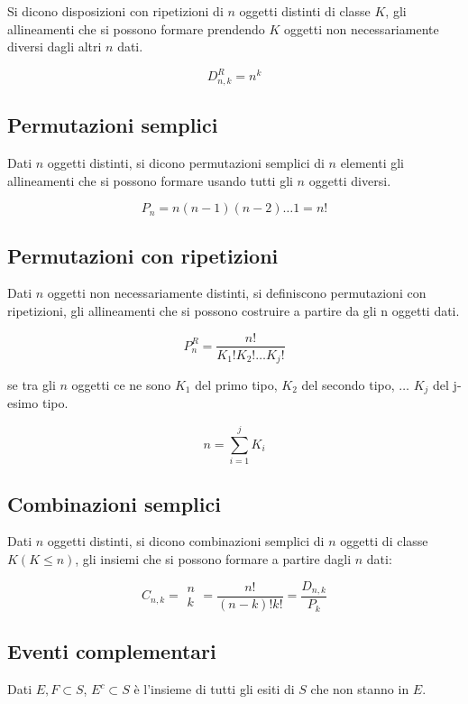 \documentclass{subfiles}
\begin{document}
Si dicono disposizioni con ripetizioni di $n$ oggetti distinti di classe $K$, gli allineamenti che si possono formare prendendo $K$ oggetti non necessariamente diversi dagli altri $n$ dati.

$$
D^R_{n,k} = n^k
$$

\subsection{Permutazioni semplici}

Dati $n$ oggetti distinti, si dicono permutazioni semplici di $n$ elementi gli allineamenti che si possono formare usando tutti gli $n$ oggetti diversi.

$$
P_n = n(n-1)(n-2)\dots1 = n!
$$

\subsection{Permutazioni con ripetizioni}

Dati $n$ oggetti non necessariamente distinti, si definiscono permutazioni con ripetizioni, gli allineamenti che si possono costruire a partire da gli n oggetti dati.

$$
P^R_n = \frac{n!}{K_1!K_2!\dots K_j!}
$$

\noindent
se tra gli $n$ oggetti ce ne sono $K_1$ del primo tipo, $K_2$ del secondo tipo, $\dots$ $K_j$ del j-esimo tipo.

$$
n = \sum^j_{i=1}K_i
$$

\subsection{Combinazioni semplici}

Dati $n$ oggetti distinti, si dicono combinazioni semplici di $n$ oggetti di classe $K (K \leq n)$, gli insiemi che si possono formare a partire dagli $n$ dati:

$$
C_{n,k} = \begin{matrix} n\\ k \end{matrix} = \frac{n!}{(n-k)!k!} = \frac{D_{n,k}}{P_k}
$$

\subsection{Eventi complementari}

Dati $E,F \subset S$, $E^c \subset S$ è l'insieme di tutti gli esiti di $S$ che non stanno in $E$.
\end{document}
